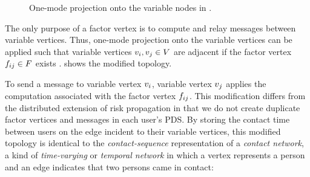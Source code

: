 \begin{figure}[htbp]
\centering
{}
\caption[One-mode projection of a factor graph]{One-mode projection onto the variable nodes in .}
\label{fig:projected}
\end{figure}

The only purpose of a factor vertex is to compute and relay messages between variable vertices. Thus, one-mode projection onto the variable vertices can be applied such that variable vertices $\vVariable[i],\vVariable[j] \in \vVariables$ are adjacent if the factor vertex $\vFactor[ij] \in \vFactors$ exists \cite{Zhou2007}.  shows the modified topology.

To send a message to variable vertex $\vVariable[i]$, variable vertex $\vVariable[j]$ applies the computation associated with the factor vertex $\vFactor[ij]$. This modification differs from the distributed extension of risk propagation \cite{Ayday2021} in that we do not create duplicate factor vertices and messages in each user's PDS. By storing the contact time between users on the edge incident to their variable vertices, this modified topology is identical to the \emph{contact-sequence} representation of a \emph{contact network}, a kind of \emph{time-varying} or \emph{temporal network} in which a vertex represents a person and an edge indicates that two persons came in contact:

